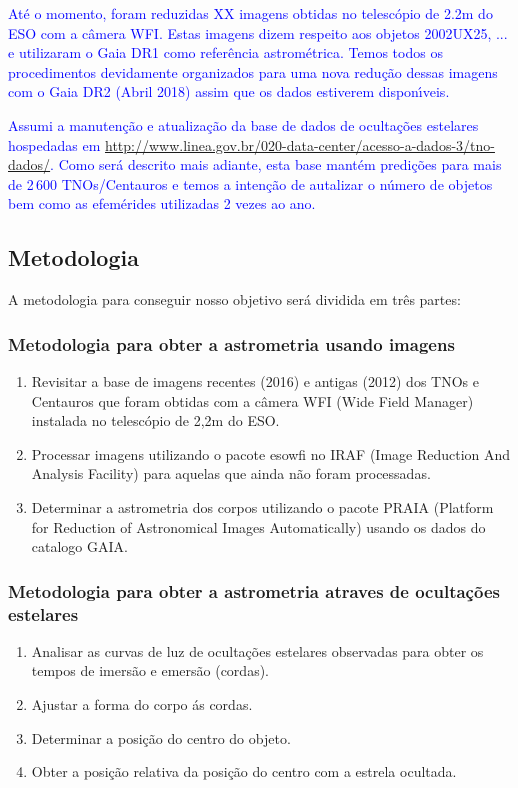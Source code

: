 \documentclass[a4paper, 11pt]{article}
\begin{document}
\textcolor{blue}{At\'e o momento, foram reduzidas XX imagens obtidas no telesc\'opio de 2.2m do ESO com a c\^amera WFI. Estas imagens dizem respeito aos objetos 2002UX25, ... e utilizaram o Gaia DR1 como refer\^encia astrom\'etrica. Temos todos os procedimentos devidamente organizados para uma nova redu\c c\~ao dessas imagens com o Gaia DR2 (Abril 2018) assim que os dados estiverem dispon\'{\i}veis.}

\textcolor{blue}{Assumi a manuten\c c\~ao e atualiza\c c\~ao da base de dados de oculta\c c\~oes estelares hospedadas em \url{http://www.linea.gov.br/020-data-center/acesso-a-dados-3/tno-dados/}. Como ser\'a descrito mais adiante, esta base mant\'em predi\c c\~oes para mais de 2\,600 TNOs/Centauros e temos a inten\c c\~ao de autalizar o n\'umero de objetos bem como as efem\'erides utilizadas 2 vezes ao ano.}

\newpage     
\subsection{Metodologia}

A metodologia para conseguir nosso objetivo será dividida em três partes:

\subsubsection{Metodologia para obter a astrometria usando imagens}
\begin{enumerate}
  \item Revisitar a base de imagens recentes (2016) e antigas (2012) dos TNOs e Centauros que foram obtidas com a câmera WFI (Wide Field Manager) instalada no telescópio de 2,2m do ESO.
  \item Processar imagens utilizando o pacote esowfi no IRAF (Image Reduction And Analysis Facility) para aquelas que ainda não foram processadas.
  \item Determinar a astrometria dos corpos utilizando o pacote PRAIA (Platform for Reduction of Astronomical Images Automatically) usando os dados do catalogo GAIA.
\end{enumerate}

\subsubsection{Metodologia para obter a astrometria atraves de ocultações estelares}
\begin{enumerate}
  \item Analisar as curvas de luz de ocultações estelares observadas para obter os tempos de imersão e emersão (cordas).
  \item Ajustar a forma do corpo ás cordas.
  \item Determinar a posição do centro do objeto.
  \item Obter a posição relativa da posição do centro com a estrela ocultada.
\end{enumerate}
\end{document}
